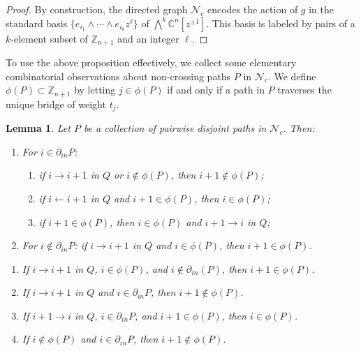 \documentclass[12pt]{amsart}
\newcommand{\CC}{\mathbb{C}}
\newcommand{\ZZ}{\mathbb{Z}}
\newcommand{\cN}{\mathcal{N}} %
\newtheorem{lemma}[theorem]{Lemma}
\numberwithin{equation}{section}
\begin{document}
\begin{proof}
By construction, the directed graph $\cN_c$ encodes the action of $g$ in the standard basis $\{ e_{i_1} \wedge \cdots \wedge e_{i_k} z^\ell\}$ of $\bigwedge^k \CC^n[z^{\pm 1}]$. 
This basis is labeled by pairs of a $k$-element subset of $\ZZ_{n+1}$ and an integer $\ell$.
\end{proof}

To use the above proposition effectively, we collect some elementary combinatorial observations about non-crossing paths $P$ in $\cN_c$. 
We define $\phi(P) \subset \ZZ_{n+1}$ by letting $j \in \phi(P)$ if and only if a path in $P$ traverses the unique bridge of weight $t_j$.

\begin{lemma}\label{lem:phi}
  Let $P$ be a collection of pairwise disjoint paths in $\cN_c$.  Then:
  \begin{enumerate}
    \item For $i\in\partial_{in}P$:
    \begin{enumerate}
      \item if $i\to i+1$ in $Q$ or $i\notin\phi(P)$, then $i+1\notin\phi(P)$;
      \item if $i\leftarrow i+1$ in $Q$ and $i+1\in\phi(P)$, then $i\in\phi(P)$;
      \item[(b')] if  $i+1\in\phi(P)$, then $i\in\phi(P)$ and $i+1\to i$ in $Q$;
    \end{enumerate}
    \item For $i\notin\partial_{in}P$: if $i\to i+1$ in $Q$ and $i\in\phi(P)$, then $i+1\in\phi(P)$.\\
  \end{enumerate}
  \begin{enumerate}
    \item If $i \to i+1$ in $Q$, $i \in \phi(P)$, and $i \notin \partial_{in}(P)$, then $i + 1 \in \phi(P)$.
    \item If $i \to i+1$ in $Q$ and $i \in \partial_{in}P$, then $i +1 \notin \phi(P)$.
    \item If $i+1 \to i$ in $Q$, $i \in \partial_{in}P$, and $i+1 \in \phi(P)$, then $i \in \phi(P)$.
    \item If $i \notin \phi(P)$ and $i \in \partial_{in}P$, then $i +1 \notin \phi(P)$.
  \end{enumerate}
\end{lemma}
\end{document}

